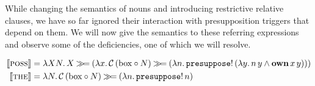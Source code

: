 While changing the semantics of nouns and introducing restrictive relative
clauses, we have so far ignored their interaction with presupposition
triggers that depend on them. We will now give the semantics to these
referring expressions and observe some of the deficiencies, one of which we
will resolve.

\begin{align*}
  \llbracket \textsc{poss} \rrbracket &= \lambda X N.\, X \mathbin{\gg\!=} (\lambda x.\, \mathcal{C}\,(\mathrm{box} \circ N) \mathbin{\gg\!=} (\lambda n.\, \mathtt{presuppose}!\,(\lambda y.\, n\,y \land \textbf{own}\,x\,y))) \\
  \llbracket \textsc{the} \rrbracket &= \lambda N.\, \mathcal{C}\,(\mathrm{box} \circ N) \mathbin{\gg\!=} (\lambda n.\, \mathtt{presuppose}!\,n)
\end{align*}
